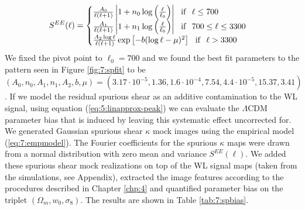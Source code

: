 \begin{equation}
\label{eq:7:empmodel}
S^{EE}(\ell) = 
\begin{cases}
\frac{A_0}{\ell(\ell+1)}\left\vert1+n_0\log\left(\frac{\ell}{\ell_0}\right)\right\vert \,\,\,\,  {\rm if } \,\,\,\, \ell\leq 700 \\
\frac{A_1}{\ell(\ell+1)}\left\vert1+n_1\log\left(\frac{\ell}{\ell_0}\right)\right\vert \,\,\,\,  {\rm if } \,\,\,\, 700\leq\ell\leq 3300 \\
\frac{A_2\log{\ell}}{\ell(\ell+1)}\exp\left[-b(\log{\ell}-\mu)^2\right] \,\,\,\,  {\rm if } \,\,\,\, \ell > 3300
\end{cases} 
\end{equation}
%
We fixed the pivot point to $\ell_0=700$ and we found the best fit parameters to the pattern seen in Figure \ref{fig:7:spfit} to be $(A_0,n_0,A_1,n_1,A_2,b,\mu)=(3.17\cdot 10^{-5},1.36,1.6\cdot 10^{-4},7.54,4.4\cdot 10^{-5},15.37,3.41)$. If we model the residual spurious shear as an additive contamination to the WL signal, using equation (\ref{eq:5:linapprox-peak}) we can evaluate the $\Lambda$CDM parameter bias that is induced by leaving this systematic effect uncorrected for. We generated Gaussian spurious shear $\kappa$ mock images using the empirical model (\ref{eq:7:empmodel}). The Fourier coefficients for the spurious $\kappa$ maps were drawn from a normal distribution with zero mean and variance $S^{EE}(\ell)$. We added these spurious shear mock realizations on top of the WL signal maps (taken from the  simulations, see Appendix), extracted the image features according to the procedures described in Chapter \ref{chp:4} and quantified parameter bias on the triplet $(\Omega_m,w_0,\sigma_8)$. The results are shown in Table \ref{tab:7:spbias}.
%
